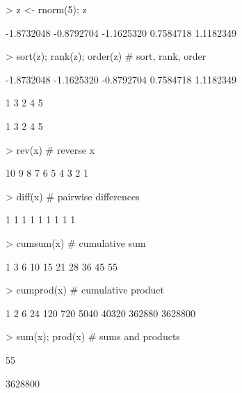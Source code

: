 \begin{Schunk}
\begin{Sinput}
> z <- rnorm(5); z
\end{Sinput}
\begin{Soutput}
[1] -1.8732048 -0.8792704 -1.1625320  0.7584718  1.1182349
\end{Soutput}
\begin{Sinput}
> sort(z); rank(z); order(z)              # sort, rank, order
\end{Sinput}
\begin{Soutput}
[1] -1.8732048 -1.1625320 -0.8792704  0.7584718  1.1182349
\end{Soutput}
\begin{Soutput}
[1] 1 3 2 4 5
\end{Soutput}
\begin{Soutput}
[1] 1 3 2 4 5
\end{Soutput}
\begin{Sinput}
> rev(x)                                  # reverse x
\end{Sinput}
\begin{Soutput}
 [1] 10  9  8  7  6  5  4  3  2  1
\end{Soutput}
\end{Schunk}

\begin{Schunk}
\begin{Sinput}
> diff(x)                                 # pairwise differences
\end{Sinput}
\begin{Soutput}
[1] 1 1 1 1 1 1 1 1 1
\end{Soutput}
\begin{Sinput}
> cumsum(x)                               # cumulative sum
\end{Sinput}
\begin{Soutput}
 [1]  1  3  6 10 15 21 28 36 45 55
\end{Soutput}
\begin{Sinput}
> cumprod(x)                              # cumulative product
\end{Sinput}
\begin{Soutput}
 [1]       1       2       6      24     120     720    5040   40320  362880 3628800
\end{Soutput}
\begin{Sinput}
> sum(x); prod(x)                         # sums and products
\end{Sinput}
\begin{Soutput}
[1] 55
\end{Soutput}
\begin{Soutput}
[1] 3628800
\end{Soutput}
\end{Schunk}
\label{r:sumprod}%

